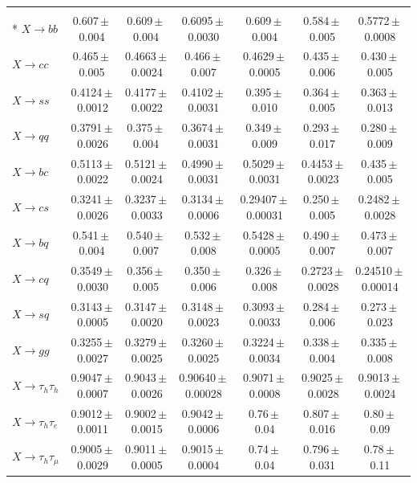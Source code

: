 \documentclass[12pt]{article}   %
\begin{document}
\begin{landscape}
{\begin{longtable}{@{\extracolsep{\fill}}lcccccc@{}}
\midrule
\endhead
\bottomrule
\endlastfoot
\multicolumn{7}{@{}l}{\textit{linear probe on the frozen features}} \\*
$X\to bb$ & 0.607\,$\pm$\,0.004 & 0.609\,$\pm$\,0.004 & 0.6095\,$\pm$\,0.0030 & 0.609\,$\pm$\,0.004 & 0.584\,$\pm$\,0.005 & 0.5772\,$\pm$\,0.0008 \\
$X\to cc$ & 0.465\,$\pm$\,0.005 & 0.4663\,$\pm$\,0.0024 & 0.466\,$\pm$\,0.007 & 0.4629\,$\pm$\,0.0005 & 0.435\,$\pm$\,0.006 & 0.430\,$\pm$\,0.005 \\
$X\to ss$ & 0.4124\,$\pm$\,0.0012 & 0.4177\,$\pm$\,0.0022 & 0.4102\,$\pm$\,0.0031 & 0.395\,$\pm$\,0.010 & 0.364\,$\pm$\,0.005 & 0.363\,$\pm$\,0.013 \\
$X\to qq$ & 0.3791\,$\pm$\,0.0026 & 0.375\,$\pm$\,0.004 & 0.3674\,$\pm$\,0.0031 & 0.349\,$\pm$\,0.009 & 0.293\,$\pm$\,0.017 & 0.280\,$\pm$\,0.009 \\
$X\to bc$ & 0.5113\,$\pm$\,0.0022 & 0.5121\,$\pm$\,0.0024 & 0.4990\,$\pm$\,0.0031 & 0.5029\,$\pm$\,0.0031 & 0.4453\,$\pm$\,0.0023 & 0.435\,$\pm$\,0.005 \\
$X\to cs$ & 0.3241\,$\pm$\,0.0026 & 0.3237\,$\pm$\,0.0033 & 0.3134\,$\pm$\,0.0006 & 0.29407\,$\pm$\,0.00031 & 0.250\,$\pm$\,0.005 & 0.2482\,$\pm$\,0.0028 \\
$X\to bq$ & 0.541\,$\pm$\,0.004 & 0.540\,$\pm$\,0.007 & 0.532\,$\pm$\,0.008 & 0.5428\,$\pm$\,0.0005 & 0.490\,$\pm$\,0.007 & 0.473\,$\pm$\,0.007 \\
$X\to cq$ & 0.3549\,$\pm$\,0.0030 & 0.356\,$\pm$\,0.005 & 0.350\,$\pm$\,0.006 & 0.326\,$\pm$\,0.008 & 0.2723\,$\pm$\,0.0028 & 0.24510\,$\pm$\,0.00014 \\
$X\to sq$ & 0.3143\,$\pm$\,0.0005 & 0.3147\,$\pm$\,0.0020 & 0.3148\,$\pm$\,0.0023 & 0.3093\,$\pm$\,0.0033 & 0.284\,$\pm$\,0.006 & 0.273\,$\pm$\,0.023 \\
$X\to gg$ & 0.3255\,$\pm$\,0.0027 & 0.3279\,$\pm$\,0.0025 & 0.3260\,$\pm$\,0.0025 & 0.3224\,$\pm$\,0.0034 & 0.338\,$\pm$\,0.004 & 0.335\,$\pm$\,0.008 \\
\midrule
$X\to \tau_h\tau_h$ & 0.9047\,$\pm$\,0.0007 & 0.9043\,$\pm$\,0.0026 & 0.90640\,$\pm$\,0.00028 & 0.9071\,$\pm$\,0.0008 & 0.9025\,$\pm$\,0.0028 & 0.9013\,$\pm$\,0.0024 \\
\midrule
$X\to \tau_h\tau_e$ & 0.9012\,$\pm$\,0.0011 & 0.9002\,$\pm$\,0.0015 & 0.9042\,$\pm$\,0.0006 & 0.76\,$\pm$\,0.04 & 0.807\,$\pm$\,0.016 & 0.80\,$\pm$\,0.09 \\
$X\to \tau_h\tau_\mu$ & 0.9005\,$\pm$\,0.0029 & 0.9011\,$\pm$\,0.0005 & 0.9015\,$\pm$\,0.0004 & 0.74\,$\pm$\,0.04 & 0.796\,$\pm$\,0.031 & 0.78\,$\pm$\,0.11 \\

\end{longtable}}
\end{landscape}
\end{document}
